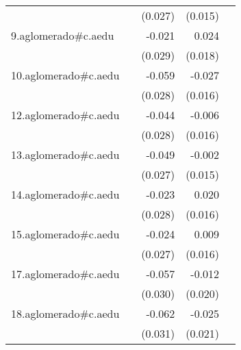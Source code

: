 {\begin{longtable}{l*{4}{D{.}{.}{-1}}}
            &                     &     (0.027)         &     (0.015)         &                     \\
\addlinespace
9.aglomerado#c.aedu&                     &      -0.021         &       0.024         &                     \\
            &                     &     (0.029)         &     (0.018)         &                     \\
\addlinespace
10.aglomerado#c.aedu&                     &      -0.059\sym{*}  &      -0.027         &                     \\
            &                     &     (0.028)         &     (0.016)         &                     \\
\addlinespace
12.aglomerado#c.aedu&                     &      -0.044         &      -0.006         &                     \\
            &                     &     (0.028)         &     (0.016)         &                     \\
\addlinespace
13.aglomerado#c.aedu&                     &      -0.049         &      -0.002         &                     \\
            &                     &     (0.027)         &     (0.015)         &                     \\
\addlinespace
14.aglomerado#c.aedu&                     &      -0.023         &       0.020         &                     \\
            &                     &     (0.028)         &     (0.016)         &                     \\
\addlinespace
15.aglomerado#c.aedu&                     &      -0.024         &       0.009         &                     \\
            &                     &     (0.027)         &     (0.016)         &                     \\
\addlinespace
17.aglomerado#c.aedu&                     &      -0.057         &      -0.012         &                     \\
            &                     &     (0.030)         &     (0.020)         &                     \\
\addlinespace
18.aglomerado#c.aedu&                     &      -0.062\sym{*}  &      -0.025         &                     \\
            &                     &     (0.031)         &     (0.021)         &                     \\

\end{longtable}}
